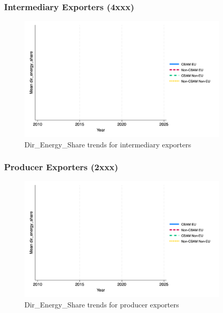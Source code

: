 \documentclass{article}
\begin{document}
\subsubsection{Intermediary Exporters (4xxx)}
\begin{figure}[h!]
\centering
\includegraphics[width=0.9\textwidth]{dir_energy_share_ei.png}
\caption{Dir_Energy_Share trends for intermediary exporters}
\label{fig:dir_energy_share_ei}
\end{figure}

\subsubsection{Producer Exporters (2xxx)}
\begin{figure}[h!]
\centering
\includegraphics[width=0.9\textwidth]{dir_energy_share_ep.png}
\caption{Dir_Energy_Share trends for producer exporters}
\label{fig:dir_energy_share_ep}
\end{figure}
\end{document}
